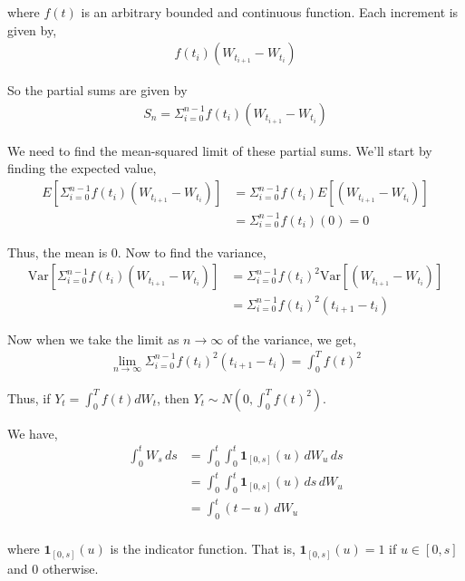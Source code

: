 \documentclass[12pt]{article}
\newenvironment{problem}[2][Problem]{\begin{trivlist}
\item[\hskip \labelsep {\bfseries #1}\hskip \labelsep {\bfseries #2.}]}{\end{trivlist}}
\begin{document}
where $f(t)$ is an arbitrary bounded and continuous function. Each increment is given by,
\begin{align*}
f(t_i)(W_{t_{i+1}} - W_{t_i})
\end{align*}

So the partial sums are given by
\begin{align*}
S_n = \Sigma_{i=0}^{n-1} f(t_i)(W_{t_{i+1}} - W_{t_i})
\end{align*}

We need to find the mean-squared limit of these partial sums. We'll start by finding the expected value,
\begin{align*}
E[\Sigma_{i=0}^{n-1} f(t_i)(W_{t_{i+1}} - W_{t_i})] &= \Sigma_{i=0}^{n-1} f(t_i)E[(W_{t_{i+1}} - W_{t_i})]\\
&= \Sigma_{i=0}^{n-1} f(t_i)(0) = 0
\end{align*}

Thus, the mean is $0$. Now to find the variance,
\begin{align*}
\text{Var}[\Sigma_{i=0}^{n-1} f(t_i)(W_{t_{i+1}} - W_{t_i})] &= \Sigma_{i=0}^{n-1} f(t_i)^2\text{Var}[(W_{t_{i+1}} - W_{t_i})]\\
&= \Sigma_{i=0}^{n-1} f(t_i)^2(t_{i+1} - t_i)
\end{align*}

Now when we take the limit as $n \to \infty$ of the variance, we get,
\begin{align*}
\lim_{n \to \infty} \Sigma_{i=0}^{n-1} f(t_i)^2(t_{i+1} - t_i) = \int_0^T f(t)^2
\end{align*}

Thus, if $Y_t = \int_0^T f(t) dW_t$, then $Y_t \sim N(0, \int_0^T f(t)^2)$.

\begin{problem}{15}
\end{problem}

We have,
\begin{align*}
\int_{0}^t W_s \,ds & = \int_0^t \int_0^t \mathbf{1}_{[0,s]} (u) \,dW_u \,ds \\
& = \int_0^t \int_0^t \mathbf{1}_{[0,s]} (u) \,ds  \,dW_u\\
& = \int_0^t (t-u) \,dW_u\\
\end{align*}

where $\mathbf{1}_{[0,s]} (u)$ is the indicator function. That is, $\mathbf{1}_{[0,s]} (u) = 1$ if $u \in [0,s]$ and $0$ otherwise.
\newpage
\begin{problem}{16}
\end{problem}
\end{document}
